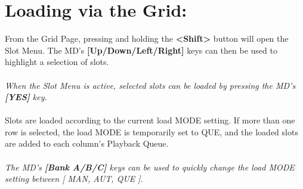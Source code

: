 \section{Loading via the Grid:}
From the Grid Page, pressing and holding the \textbf{<Shift>} button will open the Slot Menu. The MD's \textbf{[Up/Down/Left/Right]} keys can then be used to highlight a selection of slots.\\\\
\textit{When the Slot Menu is active, selected slots can be loaded by pressing the MD's \textbf{[YES]} key.}
\\\\Slots are loaded according to the current load MODE setting. If more than one row is selected, the load MODE is temporarily set to QUE, and the loaded slots are added to each column's Playback Queue.
\\\\
\textit{The MD's \textbf{[Bank A/B/C]} keys can be used to quickly change the load MODE setting between [ MAN, AUT, QUE ].}